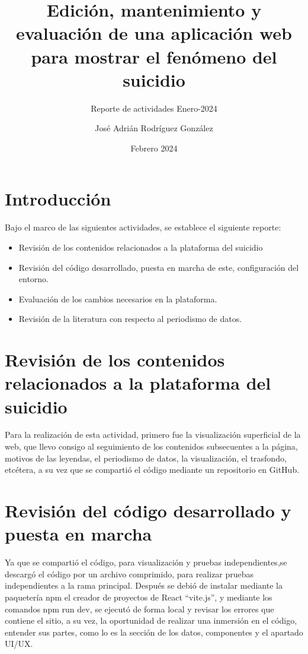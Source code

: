 \documentclass[11pt,DIV=9, letterpaper, oneside, openright]{scrartcl}
\title{Edición, mantenimiento y evaluación de una aplicación web para mostrar el fenómeno del suicidio}
\subtitle{Reporte de actividades Enero-2024}
\author{José Adrián Rodríguez González }
\date{Febrero 2024}
\begin{document}
\maketitle

\section{Introducción}

Bajo el marco de las siguientes actividades, se establece el siguiente reporte:
\begin{itemize}
    \item Revisión de los contenidos relacionados a la plataforma del suicidio
    \item Revisión del código desarrollado, puesta en marcha de este, configuración del entorno.
    \item Evaluación de los cambios necesarios en la plataforma.
    \item Revisión de la literatura con respecto al periodismo de datos.
\end{itemize}

\section{Revisión de los contenidos relacionados a la plataforma del suicidio}

Para la realización de esta actividad, primero fue la visualización superficial de la web, que llevo consigo al seguimiento de los contenidos subsecuentes a la página, motivos de las leyendas, el periodismo de datos, la visualización, el trasfondo, etcétera, a su vez que se compartió el código mediante un repositorio en GitHub.

\section{ Revisión del código desarrollado y puesta en marcha}

Ya que se compartió el código, para visualización y pruebas independientes,se descargó el código por un archivo comprimido, para realizar pruebas independientes a la rama principal. Después se debió de instalar mediante la paquetería npm el creador de proyectos de React ``vite.js'', y mediante los comandos npm run dev, se ejecutó de forma local y revisar los errores que contiene el sitio, a su vez, la oportunidad de realizar una inmersión en el código, entender sus partes, como lo es la sección de los datos, componentes y el apartado UI/UX.
\end{document}

